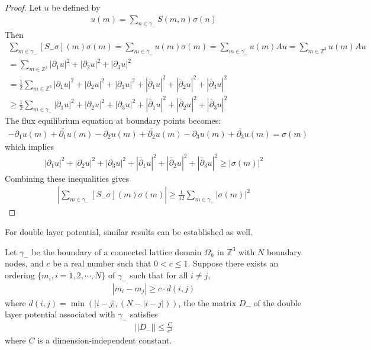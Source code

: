 \begin{proof}
Let $u$ be defined by
\begin{align}
u(m) = \sum_{n\in\gamma_-} S(m,n)\sigma(n)
\end{align}
Then
\begin{subequations}
\begin{align}
\sum_{m\in\gamma_-} [S_-\sigma](m) \sigma(m) = \sum_{m\in\gamma_-} u(m)\sigma(m) = \sum_{m\in\gamma_-} u(m)Au = \sum_{m\in\mathbb{Z}^3} u(m)Au\\
=\sum_{m\in\mathbb{Z}^3} |\partial_1u|^2+|\partial_2u|^2+|\partial_3u|^2\\
=\frac{1}{2}\sum_{m\in\mathbb{Z}^3} |\partial_1u|^2+|\partial_2u|^2+|\partial_3u|^2+|\bar{\partial}_1u|^2+|\bar{\partial}_2u|^2+|\bar{\partial}_3u|^2\\
\geq\frac{1}{2}\sum_{m\in\gamma_-} |\partial_1u|^2+|\partial_2u|^2+|\partial_3u|^2+|\bar{\partial}_1u|^2+|\bar{\partial}_2u|^2+|\bar{\partial}_3u|^2
\end{align}
\end{subequations}
The flux equilibrium equation at boundary points becomes:
\begin{align}
-\partial_1 u(m)+\bar{\partial_1}u(m)-\partial_2 u(m)+\bar{\partial_2}u(m)-\partial_3 u(m)+\bar{\partial_3}u(m)=\sigma(m)
\end{align}
which implies
\begin{align}
|\partial_1u|^2+|\partial_2u|^2+|\partial_3u|^2+|\bar{\partial}_1u|^2+|\bar{\partial}_2u|^2+|\bar{\partial}_3u|^2\geq |\sigma(m)|^2
\end{align}
Combining these inequalities gives
\begin{align}
\left|\sum_{m\in\gamma_-} [S_-\sigma](m) \sigma(m)\right|\geq \frac{1}{12}\sum_{m\in\gamma_-} |\sigma(m)|^2
\end{align}

\end{proof}

For double layer potential, similar results can be established as well.
\begin{theorem}
Let $\gamma_-$ be the boundary of a connected lattice domain $\Omega_h$ in $\mathbb{Z}^3$ with $N$ boundary nodes, and $c$ be a real number such that $0<c\leq 1$. Suppose there exists an ordering $\{m_i,i=1,2,\cdots,N\}$ of $\gamma_-$ such that for all $i\neq j$,
\begin{align}
|m_i-m_j|\geq c\cdot d(i,j)
\end{align}
where $d(i,j)=\min(|i-j|,(N-|i-j|))$, the the matrix $D_-$ of the double layer potential associated with $\gamma_-$ satisfies
\begin{align}
||D_-||\leq \frac{C}{c^2}
\end{align}
where $C$ is a dimension-independent constant.
\end{theorem}

